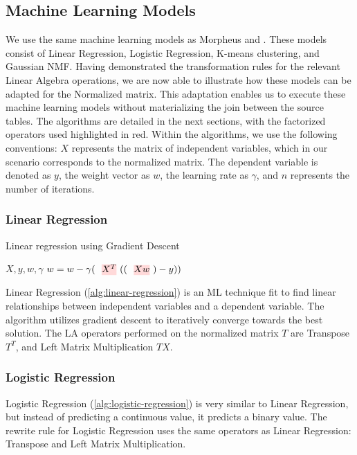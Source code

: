 \subsection{Machine Learning Models}
We use the same machine learning models as Morpheus \cite{morpheus} and \cite{amalur_tkde24}. These models consist of Linear Regression, Logistic Regression, K-means clustering, and Gaussian NMF. Having demonstrated the transformation rules for the relevant Linear Algebra operations, we are now able to illustrate how these models can be adapted for the Normalized matrix. This adaptation enables us to execute these machine learning models without materializing the join between the source tables. The algorithms are detailed in the next sections, with the factorized operators used highlighted in red. Within the algorithms, we use the following conventions: $X$ represents the matrix of independent variables, which in our scenario corresponds to the normalized matrix. The dependent variable is denoted as $y$, the weight vector as $w$, the learning rate as $\gamma$, and $n$ represents the number of iterations.

\subsubsection{Linear Regression}
\begin{algorithm}[ht!]
  \caption[Linear regression]{Linear regression using Gradient Descent
    \cite{morpheus}}\label{alg:linear-regression}
  \begin{algorithmic}
    \Require $X, y , w, \gamma$
    \State $w = w - \gamma (\text{\red{$X^T$}}((\text{\red{$X w$}}) - y))$
    \EndFor
  \end{algorithmic}
\end{algorithm}
Linear Regression (\autoref{alg:linear-regression}) is an ML technique fit to find linear relationships between independent variables and a dependent variable. The algorithm utilizes gradient descent to iteratively converge towards the best solution. The LA operators performed on the normalized matrix $T$ are Transpose $T^T$, and Left Matrix Multiplication $TX$.

\subsubsection{Logistic Regression}
Logistic Regression (\autoref{alg:logistic-regression}) is very similar to Linear Regression, but instead of predicting a continuous value, it predicts a binary value. The rewrite rule for Logistic Regression uses the same operators as Linear Regression: Transpose and Left Matrix Multiplication.

